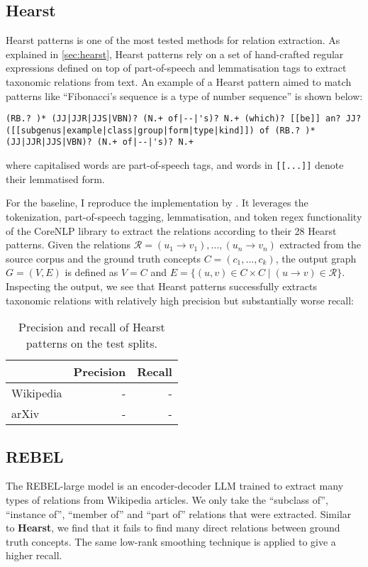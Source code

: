\subsection{Hearst}
Hearst patterns \cite{hearst1998automated} is one of the most tested methods for relation extraction. As explained in \cref{sec:hearst}, Hearst patterns rely on a set of hand-crafted regular expressions defined on top of part-of-speech and lemmatisation tags to extract taxonomic relations from text. An example of a Hearst pattern aimed to match patterns like ``Fibonacci's sequence is a type of number sequence'' is shown below:
\begin{lstlisting}
(RB.? )* (JJ|JJR|JJS|VBN)? (N.+ of|--|'s)? N.+ (which)? [[be]] an? JJ? ([[subgenus|example|class|group|form|type|kind]]) of (RB.? )* (JJ|JJR|JJS|VBN)? (N.+ of|--|'s)? N.+
\end{lstlisting}
where capitalised words are part-of-speech tags, and words in \texttt{[[...]]} denote their lemmatised form.

For the baseline, I reproduce the implementation by \citet{roller2018hearst}. It leverages the tokenization, part-of-speech tagging, lemmatisation, and token regex functionality of the CoreNLP library \cite{manning2014stanford} to extract the relations according to their 28 Hearst patterns. Given the relations $\mathcal{R} = (u_1 \to v_1), \dots, (u_n \to v_n)$ extracted from the source corpus and the ground truth concepts $C = (c_1, \dots, c_k)$, the output graph $G = (V, E)$ is defined as $V = C$ and $E = \{(u, v) \in C \times C \mid (u \to v) \in \mathcal{R}\}$. Inspecting the output, we see that Hearst patterns successfully extracts taxonomic relations with relatively high precision but substantially worse recall:
\begin{table}[H]
    \centering
    \begin{tabular}{lrr}
        \toprule
                  & Precision & Recall \\
        \midrule
        Wikipedia & -         & -      \\
        arXiv     & -         & -      \\
        \bottomrule
    \end{tabular}
    \caption{Precision and recall of Hearst patterns on the test splits.}
    \label{table:hearst-precision-recall}
\end{table}

\subsection{REBEL}
The REBEL-large model \cite{cabot2021rebel} is an encoder-decoder LLM trained to extract many types of relations from Wikipedia articles. We only take the ``subclass of'', ``instance of'', ``member of'' and ``part of'' relations that were extracted. Similar to \textbf{Hearst}, we find that it fails to find many direct relations between ground truth concepts. The same low-rank smoothing technique is applied to give a higher recall.


